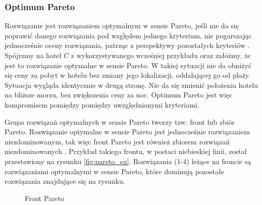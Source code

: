 \documentclass[twoside]{iisthesis}
\begin{document}
\subsubsection{Optimum Pareto}
Rozwiązanie jest rozwiązaniem optymalnym w sensie Pareto, jeśli nie da się poprawić danego rozwiązania pod względem jednego kryterium, nie pogarszając jednocześnie oceny rozwiązania, patrząc z perspektywy pozostałych kryteriów \cite{wiki_pareto}. Spójrzmy na hotel $C$ z wykorzystywanego wcześniej przykładu oraz załóżmy, że jest to rozwiązanie optymalne w sensie Pareto. W takiej sytuacji nie da obniżyć się ceny za pobyt w hotelu bez zmiany jego lokalizacji, oddalającej go od plaży. Sytuacja wygląda identycznie w drugą stronę. Nie da się zmienić położenia hotelu na bliższe morzu, bez zwiększenia ceny za noc. Optimum Pareto jest więc kompromisem pomiędzy pomiędzy uwzględnianymi kryteriami.

Grupa rozwiązań optymalnych w sensie Pareto tworzy tzw. front lub zbiór Pareto. Rozwiązanie optymalne w sensie Pareto jest jednocześnie rozwiązaniem niezdominowanym, tak więc front Pareto jest również zbiorem rozwiązań niezdominowanych \cite{book}. Przykład takiego frontu, w postaci niebieskiej linii, został przestawiony na rysunku \eqref{fig:pareto_ex}. Rozwiązania (1-4) leżące na froncie są rozwiązaniami optymalnymi w sensie Pareto, które dominują pozostałe rozwiązania znajdujące się na rysunku.
\begin{figure}[!htb]
	\centering
	\caption{Front Pareto}
	\label{fig:pareto_ex}
\end{figure}
\end{document}
